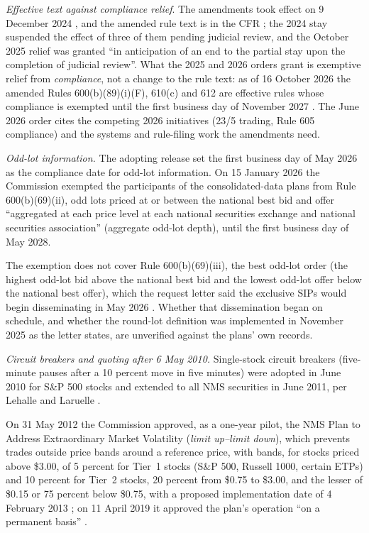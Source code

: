 \begin{qfrule}
\emph{Effective text against compliance relief}. The amendments took effect on 9 December 2024 \citep[document record]{fr-2024-21867}, and the amended rule text is in the CFR \citep[text for 14 October 2026]{cfr-242-612}; the 2024 stay suspended the effect of three of them pending judicial review, and the October 2025 relief was granted ``in anticipation of an end to the partial stay upon the completion of judicial review''. What the 2025 and 2026 orders grant is exemptive relief from \emph{compliance}, not a change to the rule text: as of 16 October 2026 the amended Rules 600(b)(89)(i)(F), 610(c) and 612 are effective rules whose compliance is exempted until the first business day of November 2027 \citep[pp.~36022--36024]{sec-34-105656}. The June 2026 order cites the competing 2026 initiatives (23/5 trading, Rule 605 compliance) and the systems and rule-filing work the amendments need.

\emph{Odd-lot information.} The adopting release set the first business day of May 2026 as the compliance date for odd-lot information. On 15 January 2026 the Commission exempted the participants of the consolidated-data plans from Rule 600(b)(69)(ii), odd lots priced at or between the national best bid and offer ``aggregated at each price level at each national securities exchange and national securities association'' (aggregate odd-lot depth), until the first business day of May 2028.

The exemption does not cover Rule 600(b)(69)(iii), the best odd-lot order (the highest odd-lot bid above the national best bid and the lowest odd-lot offer below the national best offer), which the request letter said the exclusive SIPs would begin disseminating in May 2026 \citep[pp.~1--5]{sec-34-104612}. Whether that dissemination began on schedule, and whether the round-lot definition was implemented in November 2025 as the letter states, are unverified against the plans' own records.

\emph{Circuit breakers and quoting after 6 May 2010.} Single-stock circuit breakers (five-minute pauses after a 10 percent move in five minutes) were adopted in June 2010 for S\&P 500 stocks and extended to all NMS securities in June 2011, per Lehalle and Laruelle \citep[chap.~2, sec.~2.5.2, pp.~181--182]{alpha-laruelle}.

On 31 May 2012 the Commission approved, as a one-year pilot, the NMS Plan to Address Extraordinary Market Volatility (\emph{limit up--limit down}), which prevents trades outside price bands around a reference price, with bands, for stocks priced above \$3.00, of 5 percent for Tier~1 stocks (S\&P 500, Russell 1000, certain ETPs) and 10 percent for Tier~2 stocks, 20 percent from \$0.75 to \$3.00, and the lesser of \$0.15 or 75 percent below \$0.75, with a proposed implementation date of 4 February 2013 \citep[Release 34-67091]{sec-34-67091}; on 11 April 2019 it approved the plan's operation ``on a permanent basis'' \citep[Release 34-85623]{sec-34-85623}.


\end{qfrule}
